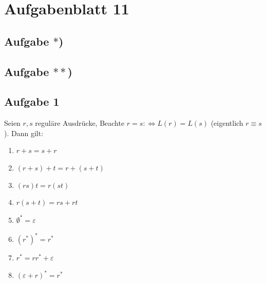 
\section{Aufgabenblatt 11}
\subsection*{Aufgabe $\ast$)}

\subsection*{Aufgabe $\ast\ast$)}

\subsection{Aufgabe 1}
Seien $r,s$ reguläre Ausdrücke, Beachte $r=s:\Longleftrightarrow L(r)=L(s)$ (eigentlich $r\equiv s$). Dann gilt:
\begin{enumerate}[label=\alph*)]
	\item $r+s=s+r$
	\item $(r+s)+t=r+(s+t)$
	\item $(rs)t=r(st)$
	\item $r(s+t)=rs+rt$
	\item $\emptyset^\ast=\varepsilon$
	\item $(r^\ast)^\ast=r^\ast$
	\item $r^\ast=rr^\ast+\varepsilon$
	\item $(\varepsilon+r)^\ast=r^\ast$
\end{enumerate}


